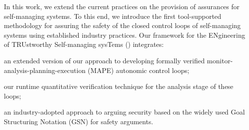 In this work, we extend the current practices on the provision of assurances for self-managing systems. To this end, we introduce the first tool-supported methodology for assuring the safety of the closed control loops of self-managing systems using established industry practices. Our framework for the ENgineering of TRUstworthy Self-managing sysTems (\approach) integrates:
\squishlist
	\item an extended version of our approach to developing formally verified monitor-analysis-planning-execution (MAPE) autonomic control loops;
	\item our runtime quantitative verification technique for the analysis stage of these loops;
	\item an industry-adopted approach to arguing security based on the widely used Goal Structuring Notation (GSN) for safety arguments.
\squishend
